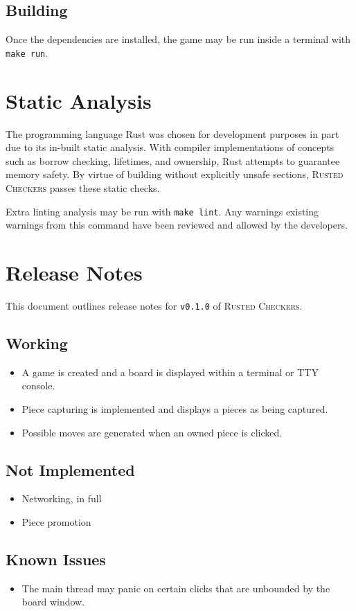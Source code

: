 \documentclass[titlepage]{article}
\begin{document}
\subsection{Building}
Once the dependencies are installed, the game may be run inside a terminal with \texttt{make run}.




\section{Static Analysis}
The programming language Rust was chosen for development purposes in part due
to its in-built static analysis. With compiler implementations of concepts such
as borrow checking, lifetimes, and ownership, Rust attempts to guarantee memory
safety. By virtue of building without explicitly unsafe sections,
\textsc{Rusted Checkers} passes these static checks.

Extra linting analysis may be run with \texttt{make lint}. Any warnings
existing warnings from this command have been reviewed and allowed by the
developers.

\section{Release Notes}
This document outlines release notes for \texttt{v0.1.0} of \textsc{Rusted Checkers}.
\subsection{Working}
\begin{itemize}
  \item A game is created and a board is displayed within a terminal or TTY console.
  \item Piece capturing is implemented and displays a pieces as being captured.
  \item Possible moves are generated when an owned piece is clicked.
\end{itemize}
\subsection{Not Implemented}
\begin{itemize}
  \item Networking, in full
  \item Piece promotion
\end{itemize}
\subsection{Known Issues}
\begin{itemize}
  \item The main thread may panic on certain clicks that are unbounded by the
    board window.
\end{itemize}


\end{document}
